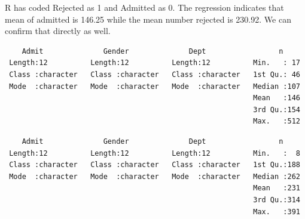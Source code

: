 \documentclass[]{book}
\newenvironment{Shaded}{\begin{snugshade}}{\end{snugshade}}
\newcommand{\CommentTok}[1]{\textcolor[rgb]{0.56,0.35,0.01}{\textit{#1}}}
\newcommand{\KeywordTok}[1]{\textcolor[rgb]{0.13,0.29,0.53}{\textbf{#1}}}
\newcommand{\NormalTok}[1]{#1}
\newcommand{\OperatorTok}[1]{\textcolor[rgb]{0.81,0.36,0.00}{\textbf{#1}}}
\newcommand{\StringTok}[1]{\textcolor[rgb]{0.31,0.60,0.02}{#1}}
\begin{document}
R has coded Rejected as 1 and Admitted as 0. The regression indicates that mean of admitted is 146.25 while the mean number rejected is 230.92. We can confirm that directly as well.

\begin{Shaded}
\end{Shaded}

\begin{verbatim}
    Admit              Gender              Dept                 n      
 Length:12          Length:12          Length:12          Min.   : 17  
 Class :character   Class :character   Class :character   1st Qu.: 46  
 Mode  :character   Mode  :character   Mode  :character   Median :107  
                                                          Mean   :146  
                                                          3rd Qu.:154  
                                                          Max.   :512  
\end{verbatim}

\begin{Shaded}
\end{Shaded}

\begin{verbatim}
    Admit              Gender              Dept                 n      
 Length:12          Length:12          Length:12          Min.   :  8  
 Class :character   Class :character   Class :character   1st Qu.:188  
 Mode  :character   Mode  :character   Mode  :character   Median :262  
                                                          Mean   :231  
                                                          3rd Qu.:314  
                                                          Max.   :391  
\end{verbatim}
\end{document}
